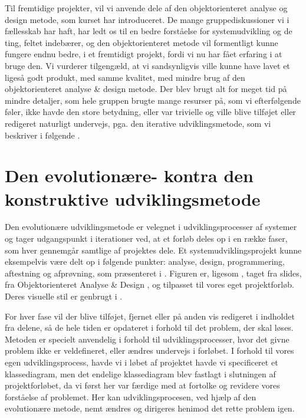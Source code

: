 Til fremtidige projekter, vil vi anvende dele af den objektorienteret analyse og design metode, som kurset har introduceret. De mange gruppediskussioner vi i fællesskab har haft, har ledt os til en bedre forståelse for systemudvikling og de ting, feltet indebærer, og den objektorienteret metode vil formentligt kunne fungere endnu bedre, i et fremtidigt projekt, fordi vi nu har fået erfaring i at bruge den. Vi vurderer tilgengæld, at vi sandsynligvis ville kunne have lavet et ligeså godt produkt, med samme kvalitet, med mindre brug af den objektorienteret analyse \& design metode. Der blev brugt alt for meget tid på mindre detaljer, som hele gruppen brugte mange resurser på, som vi efterfølgende føler, ikke havde den store betydning, eller var trivielle og ville blive tilføjet eller redigeret naturligt undervejs, pga. den iterative udviklingsmetode, som vi beskriver i følgende .


\section{Den evolutionære- kontra den konstruktive udviklingsmetode}
\label{sec:akadmiskevolutionaeremetode}

Den evolutionære udviklingsmetode er velegnet i udviklingsprocesser af systemer og tager udgangspunkt i iterationer ved, at et forløb deles op i en række faser, som hver gennemgår samtlige af projektes dele. Et systemudviklingsprojekt kunne eksempelvis være delt op i følgende punkter: analyse, design, programmering, aftestning og afprøvning, som præsenteret i . Figuren er, ligesom , taget fra slides, fra Objektorienteret Analyse \& Design \cite{ooadslide}, og tilpasset til vores eget projektforløb. Deres visuelle stil er genbrugt i .

For hver fase vil der blive tilføjet, fjernet eller på anden vis redigeret i indholdet fra delene, så de hele tiden er opdateret i forhold til det problem, der skal løses. 
Metoden er specielt anvendelig i forhold til udviklingsprocesser, hvor det givne problem ikke er veldefineret, eller ændres undervejs i forløbet. 
I forhold til vores egen udviklingsprocess, havde vi i løbet af projektet havde vi specificeret et klassediagram, men det endelige klassediagram blev fastlagt i slutningen af projektforløbet, da vi først her var færdige med at fortolke og revidere vores forståelse af problemet.
Her kan udviklingsprocesen, ved hjælp af den evolutionære metode, nemt ændres og dirigeres henimod det rette problem igen.

